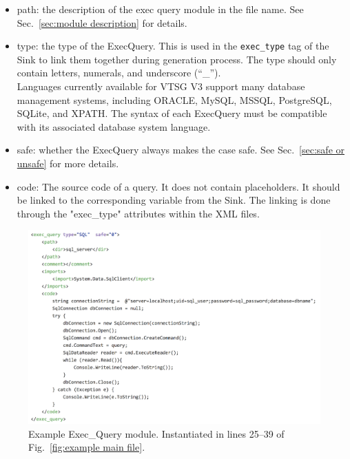 \documentclass[12pt]{article}
\begin{document}
\begin{itemize}
    \item path: the description of the exec query module in the file name.
      See Sec.~\ref{sec:module description} for details.

    \item type: the type of the ExecQuery. This is used in the
    \verb|exec_type| tag of the Sink to link them together during
    generation process.  The type should only contain letters, numerals, and
    underscore (``\_'').\\
    Languages currently available for VTSG V3 support many database management
    systems, including ORACLE, MySQL, MSSQL, PostgreSQL, SQLite, and XPATH.
    The syntax of each ExecQuery must be
    compatible with its associated database system language.
    
    \item safe: whether the ExecQuery always makes the case safe.
    See Sec.~\ref{sec:safe or unsafe} for more details.

    \item code: The source code of a query. It does not contain placeholders.
    It should be linked to the corresponding variable from the Sink. The linking is done through the "exec\_type" attributes within the XML files.
\end{itemize}


\begin{figure}[htbp]
  \includegraphics[width=\linewidth]{fig_Exec_Query_file.png}
  \caption{Example Exec\_Query module. Instantiated in lines 25--39 of
    Fig.~\ref{fig:example main file}.}
  \label{fig:example exec-query file}
\end{figure}
\end{document}
